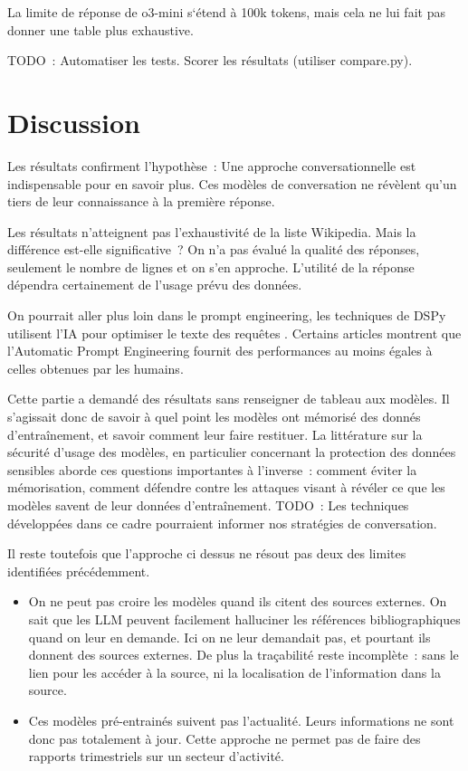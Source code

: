 \documentclass[a4paper,11pt]{report}
\providecommand{\tightlist}{\setlength{\itemsep}{0pt}\setlength{\parskip}{0pt}}
\begin{document}
La limite de réponse de o3-mini s`étend à 100k tokens, mais cela ne lui fait pas donner une table plus exhaustive.

TODO~: Automatiser les tests. Scorer les résultats (utiliser compare.py).

\section{Discussion}\label{discussion}

Les résultats confirment l'hypothèse~: Une approche conversationnelle est indispensable pour en savoir plus. Ces modèles de conversation ne révèlent qu'un tiers de leur connaissance à la première réponse.

Les résultats n'atteignent pas l'exhaustivité de la liste Wikipedia. Mais la différence est-elle significative~? On n'a pas évalué la qualité des réponses, seulement le nombre de lignes et on s'en approche. L'utilité de la réponse dépendra certainement de l'usage prévu des données.

On pourrait aller plus loin dans le prompt engineering, les techniques de DSPy utilisent l'IA pour optimiser le texte des requêtes \citep{ATRGAC9J}. Certains articles montrent que l'Automatic Prompt Engineering fournit des performances au moins égales à celles obtenues par les humains.

Cette partie a demandé des résultats sans renseigner de tableau aux modèles. Il s'agissait donc de savoir à quel point les modèles ont mémorisé des donnés d'entraînement, et savoir comment leur faire restituer. La littérature sur la sécurité d'usage des modèles, en particulier concernant la protection des données sensibles \citep{HYX8XPZI,YNTQGTBQ} aborde ces questions importantes à l'inverse~: comment éviter la mémorisation, comment défendre contre les attaques visant à révéler ce que les modèles savent de leur données d'entraînement. TODO~: Les techniques développées dans ce cadre pourraient informer nos stratégies de conversation.

Il reste toutefois que l'approche ci dessus ne résout pas deux des limites identifiées précédemment.

\begin{itemize}
\tightlist
\item
  On ne peut pas croire les modèles quand ils citent des sources externes. On sait que les LLM peuvent facilement halluciner les références bibliographiques quand on leur en demande. Ici on ne leur demandait pas, et pourtant ils donnent des sources externes. De plus la traçabilité reste incomplète~: sans le lien pour les accéder à la source, ni la localisation de l'information dans la source.
\item
  Ces modèles pré-entrainés suivent pas l'actualité. Leurs informations ne sont donc pas totalement à jour. Cette approche ne permet pas de faire des rapports trimestriels sur un secteur d'activité.
\end{itemize}
\end{document}
